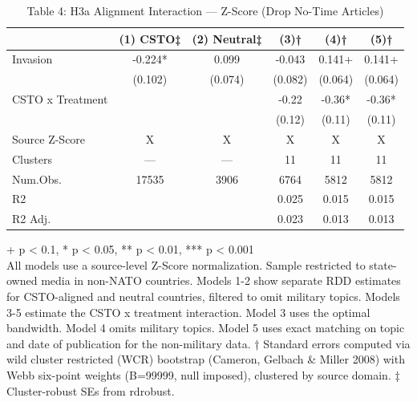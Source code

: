 \begin{table}[t]
\caption{\label{tab:table-04}Table 4: H3a Alignment Interaction — Z-Score (Drop No-Time Articles)} 
\fontsize{12.0pt}{14.0pt}\selectfont
\begin{tabular*}{\linewidth}{@{\extracolsep{\fill}}lccccc}
\toprule
  & (1) CSTO‡ & (2) Neutral‡ & (3)† & (4)† & (5)† \\ 
\midrule\addlinespace[2.5pt]
Invasion & -0.224* & 0.099 & -0.043 & 0.141+ & 0.141+ \\ 
 & (0.102) & (0.074) & (0.082) & (0.064) & (0.064) \\ 
CSTO x Treatment &  &  & -0.22 & -0.36* & -0.36* \\ 
{} & {} & {} & {(0.12)} & {(0.11)} & {(0.11)} \\ 
Source Z-Score & X & X & X & X & X \\ 
Clusters & — & — & 11 & 11 & 11 \\ 
Num.Obs. & 17535 & 3906 & 6764 & 5812 & 5812 \\ 
R2 &  &  & 0.025 & 0.015 & 0.015 \\ 
R2 Adj. &  &  & 0.023 & 0.013 & 0.013 \\ 
\bottomrule
\end{tabular*}
\begin{minipage}{\linewidth}
\vspace{.05em}
+ p < 0.1, * p < 0.05, ** p < 0.01, *** p < 0.001\\
All models use a source-level Z-Score normalization. Sample restricted to
state-owned media in non-NATO countries. Models 1-2 show separate RDD estimates
for CSTO-aligned and neutral countries, filtered to omit military topics.
Models 3-5 estimate the CSTO x treatment interaction. Model 3 uses the optimal
bandwidth. Model 4 omits military topics. Model 5 uses exact matching on topic
and date of publication for the non-military data. † Standard errors computed
via wild cluster restricted (WCR) bootstrap (Cameron, Gelbach \& Miller 2008)
with Webb six-point weights (B=99999, null imposed), clustered by source domain.
‡ Cluster-robust SEs from rdrobust.\\
\end{minipage}
\end{table}

